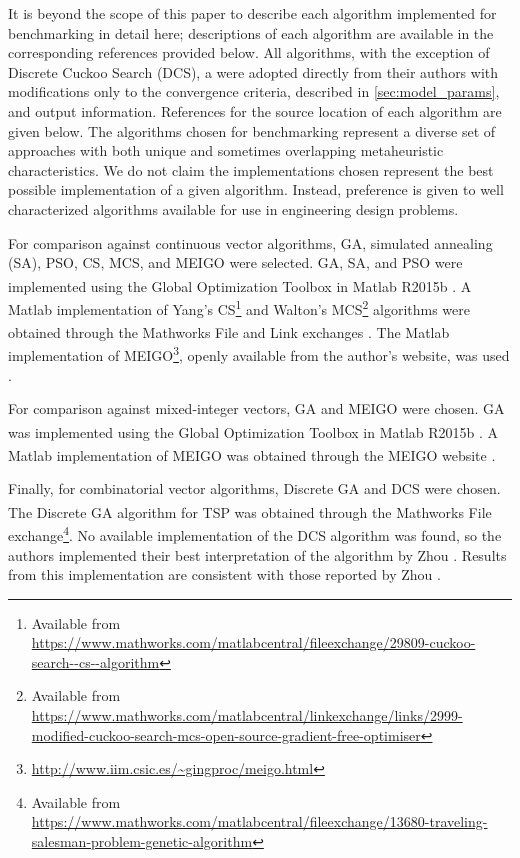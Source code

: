 \documentclass{article}                                                                           %
\begin{document}
It is beyond the scope of this paper to describe each algorithm implemented for benchmarking in detail here; descriptions of each algorithm are available in the corresponding references provided below. 
All algorithms, with the exception of Discrete Cuckoo Search (DCS), a were adopted directly from their authors with modifications only to the convergence criteria, described in \autoref{sec:model_params}, and output information.  
References for the source location of each algorithm are given below.
The algorithms chosen for benchmarking represent a diverse set of approaches with both unique and sometimes overlapping metaheuristic characteristics.  
We do not claim the implementations chosen represent the best possible implementation of a given algorithm.  
Instead, preference is given to well characterized algorithms available for use in engineering design problems.
 
For comparison against continuous vector algorithms, GA, simulated annealing (SA), PSO, CS, MCS, and MEIGO were selected.  
GA, SA, and PSO were implemented using the Global Optimization Toolbox in Matlab\textsuperscript{\textregistered} R2015b \cite{Mathworks2015}.
A Matlab\textsuperscript{\textregistered} implementation of Yang's CS\footnote{Available from \url{https://www.mathworks.com/matlabcentral/fileexchange/29809-cuckoo-search--cs--algorithm}} and Walton's MCS\footnote{Available from \url{https://www.mathworks.com/matlabcentral/linkexchange/links/2999-modified-cuckoo-search-mcs-open-source-gradient-free-optimiser}} algorithms were obtained  through the Mathworks\textsuperscript{\textregistered} File and Link exchanges \cite{Yang2009, Walton2011}.
The Matlab\textsuperscript{\textregistered} implementation of MEIGO\footnote{\url{http://www.iim.csic.es/~gingproc/meigo.html}},  openly available from the author's website, was used \cite{Egea2014}.

For comparison against mixed-integer vectors, GA and MEIGO were chosen.
GA was implemented using the Global Optimization Toolbox in Matlab\textsuperscript{\textregistered} R2015b \cite{Mathworks2015}.
A Matlab\textsuperscript{\textregistered} implementation of MEIGO was obtained through the MEIGO website \cite{Egea2014}.

Finally, for combinatorial vector algorithms, Discrete GA and DCS were chosen.
The Discrete GA algorithm for TSP was obtained  through the Mathworks\textsuperscript{\textregistered} File exchange\footnote{Available from \url{https://www.mathworks.com/matlabcentral/fileexchange/13680-traveling-salesman-problem-genetic-algorithm}}.
No available implementation of the DCS algorithm was found, so the authors implemented their best interpretation of the algorithm by Zhou \cite{Zhou2014,Ouyang2013}.  
Results from this implementation are consistent with those reported by Zhou \cite{Zhou2014}.  
\end{document}
